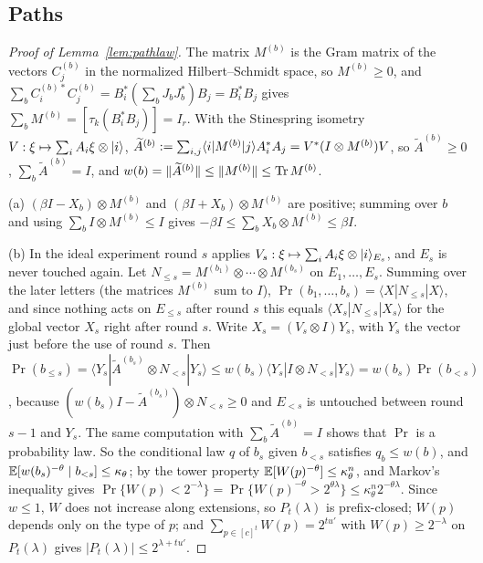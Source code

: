 \subsection{Paths}

\begin{proof}[Proof of Lemma~\ref{lem:pathlaw}]
The matrix $M^{(b)}$ is the Gram matrix of the vectors $C^{(b)}_j$ in the normalized Hilbert--Schmidt space, so $M^{(b)}\ge0$, and
$\sum_bC^{(b)*}_iC^{(b)}_j=B_i^*(\sum_bJ_bJ_b^*)B_j=B_i^*B_j$ gives $\sum_bM^{(b)}=[\tau_k(B_i^*B_j)]=I_r$. With the Stinespring isometry $V:\xi\mapsto\sum_iA_i\xi\otimes\lvert i\rangle$,
$\widetilde A^{(b)}:=\sum_{i,j}\langle i\rvert M^{(b)}\lvert j\rangle A_i^*A_j=V^*(I\otimes M^{(b)})V$, so $\widetilde A^{(b)}\ge0$, $\sum_b\widetilde A^{(b)}=I$, and
$w(b)=\lVert \widetilde A^{(b)}\rVert\le\lVert M^{(b)}\rVert\le\operatorname{Tr} M^{(b)}$.

(a) $(\beta I-X_b)\otimes M^{(b)}$ and $(\beta I+X_b)\otimes M^{(b)}$ are positive; summing over $b$ and using $\sum_bI\otimes M^{(b)}\le I$ gives
$-\beta I\le\sum_bX_b\otimes M^{(b)}\le\beta I$.

(b) In the ideal experiment round $s$ applies $V_s:\xi\mapsto\sum_iA_i\xi\otimes\lvert i\rangle_{E_s}$, and $E_s$ is never touched again. Let
$N_{\le s}=M^{(b_1)}\otimes\cdots\otimes M^{(b_s)}$ on $E_1,\dots,E_s$. Summing over the later letters (the matrices $M^{(b)}$ sum to $I$),
$\Pr(b_1,\dots,b_s)=\langle X|N_{\le s}|X\rangle$, and since nothing acts on $E_{\le s}$ after round $s$ this equals $\langle X_s|N_{\le s}|X_s\rangle$ for the global
vector $X_s$ right after round $s$. Write $X_s=(V_s\otimes I)Y_s$, with $Y_s$ the vector just before the use of round $s$. Then
$\Pr(b_{\le s})=\langle Y_s|\widetilde A^{(b_s)}\otimes N_{<s}|Y_s\rangle\le w(b_s)\langle Y_s|I\otimes N_{<s}|Y_s\rangle=w(b_s)\Pr(b_{<s})$, because
$(w(b_s)I-\widetilde A^{(b_s)})\otimes N_{<s}\ge0$ and $E_{<s}$ is untouched between round $s-1$ and $Y_s$. The same computation with $\sum_b\widetilde A^{(b)}=I$ shows that
$\Pr$ is a probability law. So the conditional law $q$ of $b_s$ given $b_{<s}$ satisfies $q_b\le w(b)$, and $\mathbb E[w(b_s)^{-\theta}\mid b_{<s}]\le\kappa_\theta$; by the tower
property $\mathbb E[W(p)^{-\theta}]\le\kappa_\theta^n$, and Markov's inequality gives $\Pr\{W(p)<2^{-\lambda}\}=\Pr\{W(p)^{-\theta}>2^{\theta\lambda}\}\le\kappa_\theta^n2^{-\theta\lambda}$.
Since $w\le1$, $W$ does not increase along extensions, so $P_t(\lambda)$ is prefix-closed; $W(p)$ depends only on the type of $p$; and
$\sum_{p\in[c]^t}W(p)=2^{tu'}$ with $W(p)\ge2^{-\lambda}$ on $P_t(\lambda)$ gives $|P_t(\lambda)|\le2^{\lambda+tu'}$.
\end{proof}

